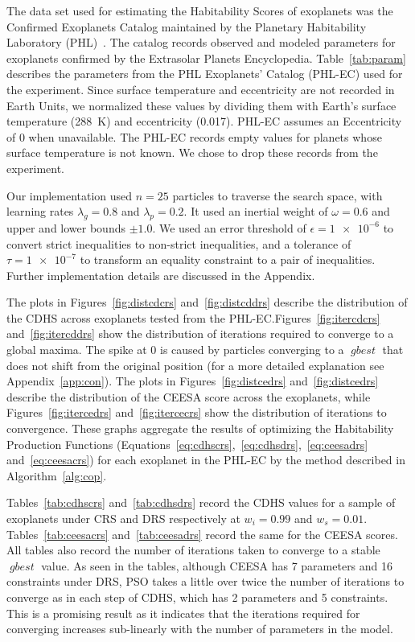 \documentclass[10pt]{article}
\DeclareMathOperator*{\gbest}{\mathit{gbest}}
\begin{document}
The data set used for estimating the Habitability Scores of exoplanets was the Confirmed Exoplanets Catalog maintained
by the Planetary Habitability Laboratory (PHL)~\cite{PHL}. The catalog records observed and modeled parameters for
exoplanets confirmed by the Extrasolar Planets Encyclopedia. Table~\ref{tab:param} describes the parameters from the PHL
Exoplanets' Catalog (PHL-EC) used for the experiment. Since surface temperature and eccentricity are not recorded in
Earth Units, we normalized these values by dividing them with Earth's surface temperature (\SI{288}{\kelvin}) and
eccentricity (\num{0.017}). PHL-EC assumes an Eccentricity of 0 when unavailable. The PHL-EC records empty values for
planets whose surface temperature is not known. We chose to drop these records from the experiment.

Our implementation used $n=25$ particles to traverse the search space, with learning rates $\lambda_g=0.8$ and
$\lambda_p=0.2$. It used an inertial weight of $\omega=0.6$ and upper and lower bounds $\pm1.0$. We used an error
threshold of $\epsilon=\num{1e-6}$ to convert strict inequalities to non-strict inequalities, and a tolerance of
$\tau=\num{1e-7}$ to transform an equality constraint to a pair of inequalities. Further implementation details are
discussed in the Appendix.

The plots in Figures~\ref{fig:distcdcrs} and~\ref{fig:distcddrs} describe the distribution of the CDHS across exoplanets
tested from the PHL-EC.\@ Figures~\ref{fig:itercdcrs} and~\ref{fig:itercddrs} show the distribution of iterations
required to converge to a global maxima. The spike at 0 is caused by particles converging to a $\gbest$ that does not
shift from the original position (for a more detailed explanation see Appendix~\ref{app:con}). The plots in
Figures~\ref{fig:distcedrs} and~\ref{fig:distcedrs} describe the distribution of the CEESA score across the exoplanets,
while Figures~\ref{fig:itercedrs} and~\ref{fig:itercecrs} show the distribution of iterations to convergence. These
graphs aggregate the results of optimizing the Habitability Production Functions
(Equations~\ref{eq:cdhscrs},~\ref{eq:cdhsdrs},~\ref{eq:ceesadrs} and~\ref{eq:ceesacrs}) for each exoplanet in the PHL-EC
by the method described in Algorithm~\ref{alg:cop}.

Tables~\ref{tab:cdhscrs} and~\ref{tab:cdhsdrs} record the CDHS values for a sample of exoplanets under CRS and DRS
respectively at $w_i=0.99$ and $w_s=0.01$. Tables~\ref{tab:ceesacrs} and~\ref{tab:ceesadrs} record the same for the
CEESA scores. All tables also record the number of iterations taken to converge to a stable $\gbest$ value. As seen in
the tables, although CEESA has 7 parameters and 16 constraints under DRS, PSO takes a little over twice the number of
iterations to converge as in each step of CDHS, which has 2 parameters and 5 constraints. This is a promising result as
it indicates that the iterations required for converging increases sub-linearly with the number of parameters in the
model.
\end{document}
